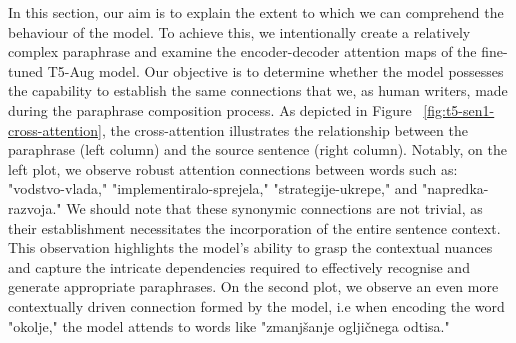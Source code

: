 \documentclass[fleqn,moreauthors,10pt]{ds_report}
\begin{document}
In this section, our aim is to explain the extent to which we can comprehend the behaviour of the model. To achieve this, we intentionally create a relatively complex paraphrase and examine the encoder-decoder attention maps of the fine-tuned T5-Aug model. Our objective is to determine whether the model possesses the capability to establish the same connections that we, as human writers, made during the paraphrase composition process. As depicted in Figure ~\ref{fig:t5-sen1-cross-attention}, the cross-attention illustrates the relationship between the paraphrase (left column) and the source sentence (right column). Notably, on the left plot, we observe robust attention connections between words such as: "vodstvo-vlada," "implementiralo-sprejela," "strategije-ukrepe," and "napredka-razvoja." We should note that these synonymic connections are not trivial, as their establishment necessitates the incorporation of the entire sentence context. This observation highlights the model's ability to grasp the contextual nuances and capture the intricate dependencies required to effectively recognise and generate appropriate paraphrases. On the second plot, we observe an even more contextually driven connection formed by the model, i.e when encoding the word "okolje," the model attends to words like "zmanjšanje ogljičnega odtisa."



\end{document}
